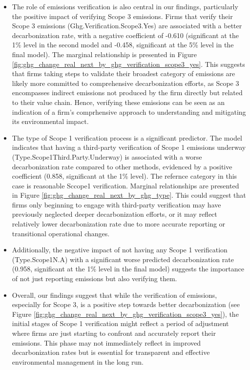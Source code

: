 \begin{itemize}
    \item The role of emissions verification is also central in our findings, particularly the positive impact of verifying Scope 3 emissions. Firms that verify their Scope 3 emissions (Ghg.Verification.Scope3.Yes) are associated with a better decarbonization rate, with a negative coefficient of -0.610 (significant at the 1\% level in the second model and -0.458, significant at the 5\% level in the final model). The marginal relationship is presented in Figure \ref{fig:ghg_change_real_next_by_ghg_verification_scope3_yes}. This suggests that firms taking steps to validate their broadest category of emissions are likely more committed to comprehensive decarbonization efforts, as Scope 3 encompasses indirect emissions not produced by the firm directly but related to their value chain. Hence, verifying these emissions can be seen as an indication of a firm's comprhensive approach to understanding and mitigating its environmental impact.

    \item The type of Scope 1 verification process is a significant predictor. The model indicates that having a third-party verification of Scope 1 emissions underway (Type.Scope1Third.Party.Underway) is associated with a worse decarbonization rate compared to other methods, evidenced by a positive coefficient (0.858, significant at the 1\% level). The refernce category in this case is reasonable Sccope1 verification. Marginal relationships are presented in Figure \ref{fig:ghg_change_real_next_by_ghg_type}. This could suggest that firms only beginning to engage with third-party verification may have previously neglected deeper decarbonization efforts, or it may reflect relatively lower decarbonization rate due to more accurate reporting or transitional operational changes.
    
    \item Additionally, the negative impact of not having any Scope 1 verification (Type.Scope1N.A) with a significant worse predicted decarbonization rate (0.958, significant at the 1\% level in the final model) suggests the importance of not just reporting emissions but also verifying them.
    
    \item Overall, our findings suggest that while the verification of emissions, especially for Scope 3, is a positive step towards better decarbonization (see Figure \ref{fig:ghg_change_real_next_by_ghg_verification_scope3_yes}), the initial stages of Scope 1 verification might reflect a period of adjustment where firms are just starting to confront and accurately report their emissions. This phase may not immediately reflect in improved decarbonization rates but is essential for transparent and effective environmental management in the long run. 
    

\end{itemize}
